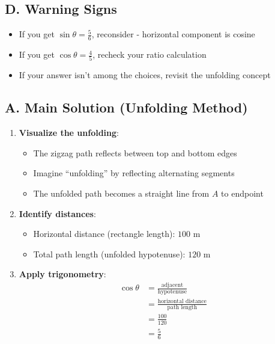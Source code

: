 \documentclass[11pt]{article}
\begin{document}
\begin{pitfallbox}
\subsection*{D. Warning Signs}
\begin{itemize}[leftmargin=*]
    \item If you get $\sin\theta = \frac{5}{6}$, reconsider - horizontal component is cosine
    \item If you get $\cos\theta = \frac{4}{5}$, recheck your ratio calculation
    \item If your answer isn't among the choices, revisit the unfolding concept
\end{itemize}
\end{pitfallbox}

\begin{solutionbox}
\subsection*{A. Main Solution (Unfolding Method)}
\begin{enumerate}[leftmargin=*]
    \item \textbf{Visualize the unfolding}:
    \begin{itemize}
        \item The zigzag path reflects between top and bottom edges
        \item Imagine ``unfolding'' by reflecting alternating segments
        \item The unfolded path becomes a straight line from $A$ to endpoint
    \end{itemize}
    
    \item \textbf{Identify distances}:
    \begin{itemize}
        \item Horizontal distance (rectangle length): $100$ m
        \item Total path length (unfolded hypotenuse): $120$ m
    \end{itemize}
    
    \item \textbf{Apply trigonometry}:
    \begin{align*}
    \cos\theta &= \frac{\text{adjacent}}{\text{hypotenuse}}\\
    &= \frac{\text{horizontal distance}}{\text{path length}}\\
    &= \frac{100}{120}\\
    &= \frac{5}{6}
    \end{align*}
    

\end{enumerate}
\end{solutionbox}
\end{document}
